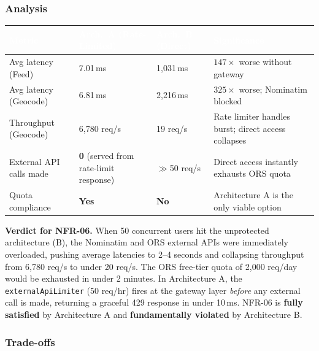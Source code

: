 \documentclass[12pt, a4paper]{article}
\newcommand{\thcell}[1]{\textcolor{white}{\textbf{\small #1}}}
\begin{document}
\subsubsection{Analysis}

\begin{longtable}{L{3.5cm} C{2.8cm} C{2.8cm} L{4.0cm}}
\toprule
{}
\thcell{Metric} & \thcell{Arch.\ A (Rate-Limited)} & \thcell{Arch.\ B (Direct)} & \thcell{Significance} \\
\midrule
\endhead
\bottomrule
\endfoot

Avg latency (Feed) & 7.01\,ms & 1,031\,ms & $147\times$ worse without gateway \\
Avg latency (Geocode) & 6.81\,ms & 2,216\,ms & $325\times$ worse; Nominatim blocked \\
Throughput (Geocode) & 6,780 req/s & 19 req/s & Rate limiter handles burst; direct access collapses \\
External API calls made & \textbf{0} (served from rate-limit response) & $\gg$50 req/s & Direct access instantly exhausts ORS quota \\
Quota compliance & \textbf{Yes} & \textbf{No} & Architecture A is the only viable option \\

\end{longtable}

\begin{tcolorbox}[notebox]
  \textbf{Verdict for NFR-06.} When 50 concurrent users hit the unprotected architecture (B), the Nominatim and ORS external APIs were immediately overloaded, pushing average latencies to 2--4 seconds and collapsing throughput from 6,780 req/s to under 20 req/s. The ORS free-tier quota of 2,000 req/day would be exhausted in under 2 minutes. In Architecture A, the \texttt{externalApiLimiter} (50 req/hr) fires at the gateway layer \emph{before} any external call is made, returning a graceful 429 response in under 10\,ms. NFR-06 is \textbf{fully satisfied} by Architecture A and \textbf{fundamentally violated} by Architecture B.
\end{tcolorbox}

\subsubsection{Trade-offs}
\end{document}
